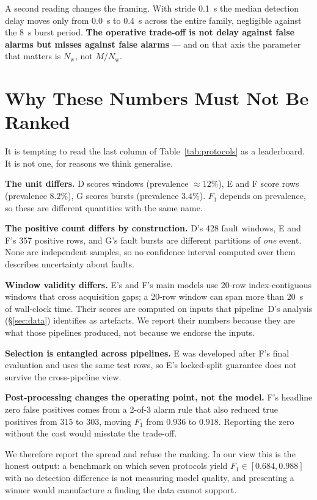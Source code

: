 \documentclass{article}
\begin{document}
A second reading changes the framing. With stride \SI{0.1}{\second} the median
detection delay moves only from \SI{0.0}{\second} to \SI{0.4}{\second} across
the entire family, negligible against the \SI{8}{\second} burst period.
\textbf{The operative trade-off is not delay against false alarms but misses
against false alarms} --- and on that axis the parameter that matters is
$N_{\mathrm w}$, not $M/N_{\mathrm w}$.

\section{Why These Numbers Must Not Be Ranked}
\label{sec:nocompare}

It is tempting to read the last column of Table~\ref{tab:protocols} as a
leaderboard. It is not one, for reasons we think generalise.

\textbf{The unit differs.} D scores windows (prevalence $\approx 12\%$), E and
F score rows (prevalence $8.2\%$), G scores bursts (prevalence $3.4\%$). $F_1$
depends on prevalence, so these are different quantities with the same name.

\textbf{The positive count differs by construction.} D's 428 fault windows, E
and F's 357 positive rows, and G's fault bursts are different partitions of
\emph{one} event. None are independent samples, so no confidence interval
computed over them describes uncertainty about faults.

\textbf{Window validity differs.} E's and F's main models use 20-row
index-contiguous windows that cross acquisition gaps; a 20-row window can span
more than \SI{20}{\second} of wall-clock time. Their scores are computed on
inputs that pipeline~D's analysis (\S\ref{sec:data}) identifies as artefacts.
We report their numbers because they are what those pipelines produced, not
because we endorse the inputs.

\textbf{Selection is entangled across pipelines.} E was developed after F's
final evaluation and uses the same test rows, so E's locked-split guarantee
does not survive the cross-pipeline view.

\textbf{Post-processing changes the operating point, not the model.} F's
headline zero false positives comes from a 2-of-3 alarm rule that also reduced
true positives from $315$ to $303$, moving $F_1$ from $0.936$ to $0.918$.
Reporting the zero without the cost would misstate the trade-off.

We therefore report the spread and refuse the ranking. In our view this is the
honest output: a benchmark on which seven protocols yield $F_1 \in
[0.684, 0.988]$ with no detection difference is not measuring model quality,
and presenting a winner would manufacture a finding the data cannot support.
\end{document}
